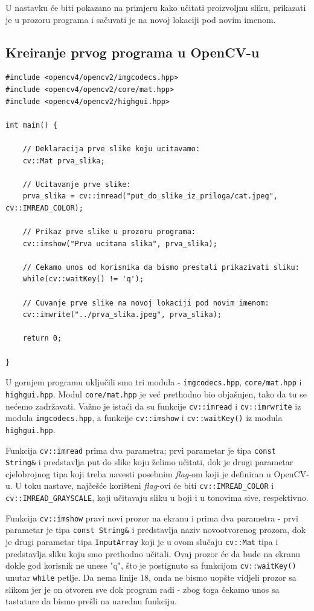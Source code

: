 \documentclass[a4paper, 12pt]{article}
\begin{document}
U nastavku će biti pokazano na primjeru kako učitati proizvoljnu sliku, prikazati je u prozoru programa i sačuvati je na novoj lokaciji pod novim imenom.

\subsection*{Kreiranje prvog programa u OpenCV-u}

\begin{lstlisting}
#include <opencv4/opencv2/imgcodecs.hpp>
#include <opencv4/opencv2/core/mat.hpp>
#include <opencv4/opencv2/highgui.hpp>

int main() {

    // Deklaracija prve slike koju ucitavamo:
    cv::Mat prva_slika;

    // Ucitavanje prve slike:
    prva_slika = cv::imread("put_do_slike_iz_priloga/cat.jpeg", cv::IMREAD_COLOR);

    // Prikaz prve slike u prozoru programa:
    cv::imshow("Prva ucitana slika", prva_slika);

    // Cekamo unos od korisnika da bismo prestali prikazivati sliku:
    while(cv::waitKey() != 'q');

    // Cuvanje prve slike na novoj lokaciji pod novim imenom:
    cv::imwrite("../prva_slika.jpeg", prva_slika);

    return 0;

}
\end{lstlisting}

U gornjem programu uključili smo tri modula - \lstinline{imgcodecs.hpp}, \lstinline{core/mat.hpp} i \lstinline{highgui.hpp}. Modul \lstinline{core/mat.hpp} je već prethodno bio objašnjen, tako da tu se nećemo zadržavati. Važno je istaći da su funkcije \lstinline{cv::imread} i \lstinline{cv::imrwrite} iz modula \lstinline{imgcodecs.hpp}, a funkcije \lstinline{cv::imshow} i \lstinline{cv::waitKey()} iz modula \lstinline{highgui.hpp}.

Funkcija \lstinline{cv::imread} prima dva parametra; prvi parametar je tipa \lstinline{const String&} i predstavlja put do slike koju želimo učitati, dok je drugi parametar cjelobrojnog tipa koji treba navesti posebnim \textit{flag}-om koji je definiran u OpenCV-u. U toku nastave, najčešće korišteni \textit{flag}-ovi će biti \lstinline{cv::IMREAD_COLOR} i \lstinline{cv::IMREAD_GRAYSCALE}, koji učitavaju sliku u boji i u tonovima sive, respektivno.

Funkcija \lstinline{cv::imshow} pravi novi prozor na ekranu i prima dva parametra - prvi parametar je tipa \lstinline{const String&} i predstavlja naziv novootvorenog prozora, dok je drugi parametar tipa \lstinline{InputArray} koji je u ovom slučaju \lstinline{cv::Mat} tipa i predstavlja sliku koju smo prethodno učitali. Ovaj prozor će da bude na ekranu dokle god korisnik ne unese "q", što je postignuto sa funkcijom \lstinline{cv::waitKey()} unutar \lstinline{while} petlje. Da nema linije 18, onda ne bismo uopšte vidjeli prozor sa slikom jer je on otvoren sve dok program radi - zbog toga čekamo unos sa tastature da bismo prešli na narednu funkciju.
\end{document}
